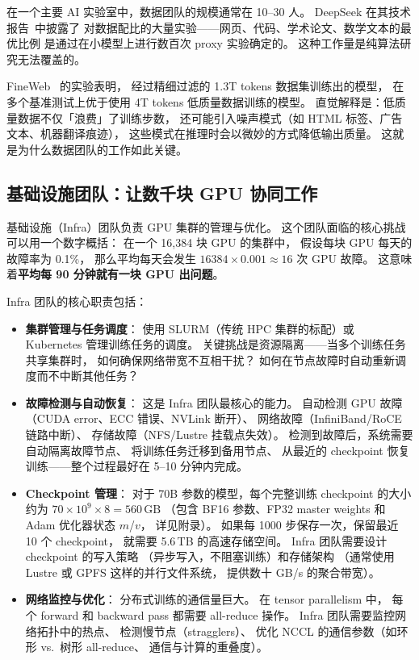 在一个主要 AI 实验室中，数据团队的规模通常在 10--30 人。
DeepSeek 在其技术报告~\cite{deepseekv3}中披露了
对数据配比的大量实验——网页、代码、学术论文、数学文本的最优比例
是通过在小模型上进行数百次 proxy 实验确定的。
这种工作量是纯算法研究无法覆盖的。

\begin{whybox}
FineWeb~\cite{penedo2024fineweb} 的实验表明，
经过精细过滤的 1.3T tokens 数据集训练出的模型，
在多个基准测试上优于使用 4T tokens 低质量数据训练的模型。
直觉解释是：低质量数据不仅「浪费」了训练步数，
还可能引入噪声模式（如 HTML 标签、广告文本、机器翻译痕迹），
这些模式在推理时会以微妙的方式降低输出质量。
这就是为什么数据团队的工作如此关键。
\end{whybox}

\subsection{基础设施团队：让数千块 GPU 协同工作}

基础设施（Infra）团队负责 GPU 集群的管理与优化。
这个团队面临的核心挑战可以用一个数字概括：
在一个 16,384 块 GPU 的集群中，
假设每块 GPU 每天的故障率为 0.1\%，
那么平均每天会发生 $16384 \times 0.001 \approx 16$ 次 GPU 故障。
这意味着\textbf{平均每 90 分钟就有一块 GPU 出问题}。

Infra 团队的核心职责包括：

\begin{itemize}[noitemsep]
  \item \textbf{集群管理与任务调度}：
        使用 SLURM（传统 HPC 集群的标配）或 Kubernetes
        管理训练任务的调度。
        关键挑战是资源隔离——当多个训练任务共享集群时，
        如何确保网络带宽不互相干扰？
        如何在节点故障时自动重新调度而不中断其他任务？
  \item \textbf{故障检测与自动恢复}：
        这是 Infra 团队最核心的能力。
        自动检测 GPU 故障（CUDA error、ECC 错误、NVLink 断开）、
        网络故障（InfiniBand/RoCE 链路中断）、
        存储故障（NFS/Lustre 挂载点失效）。
        检测到故障后，系统需要自动隔离故障节点、
        将训练任务迁移到备用节点、
        从最近的 checkpoint 恢复训练——整个过程最好在 5--10 分钟内完成。
  \item \textbf{Checkpoint 管理}：
        对于 70B 参数的模型，每个完整训练 checkpoint 的大小约为
        $70 \times 10^9 \times 8 = 560\,\mathrm{GB}$
        （包含 BF16 参数、FP32 master weights 和 Adam 优化器状态 $m$/$v$，
        详见附录）。
        如果每 1000 步保存一次，保留最近 10 个 checkpoint，
        就需要 5.6\,TB 的高速存储空间。
        Infra 团队需要设计 checkpoint 的写入策略
        （异步写入，不阻塞训练）和存储架构
        （通常使用 Lustre 或 GPFS 这样的并行文件系统，
        提供数十 GB/s 的聚合带宽）。
  \item \textbf{网络监控与优化}：
        分布式训练的通信量巨大。
        在 tensor parallelism 中，
        每个 forward 和 backward pass 都需要 all-reduce 操作。
        Infra 团队需要监控网络拓扑中的热点、
        检测慢节点（stragglers）、
        优化 NCCL 的通信参数（如环形 vs.\ 树形 all-reduce、
        通信与计算的重叠度）。
\end{itemize}

